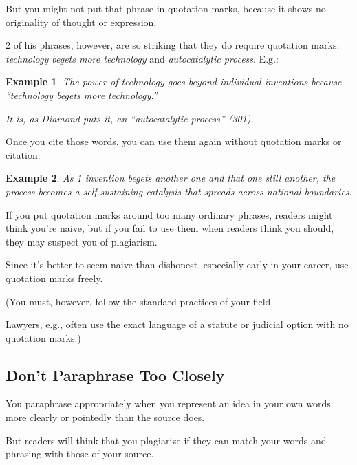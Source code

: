 \documentclass[oneside]{book}
\numberwithin{equation}{section}
\newtheorem{example}{Example}[section]
\begin{document}
But you might not put that phrase in quotation marks, because it shows no originality of thought or expression.

%
2 of his phrases, however, are so striking that they do require quotation marks: \textit{technology begets more technology} and \textit{autocatalytic process}. E.g.:
\begin{example}
    The power of technology goes beyond individual inventions because ``technology begets more technology.''
    
    It is, as Diamond puts it, an ``autocatalytic process'' (301).
\end{example}
Once you cite those words, you can use them again without quotation marks or citation:
\begin{example}
    As 1 invention begets another one and that one still another, the process becomes a self-sustaining catalysis that spreads across national boundaries.
\end{example}

If you put quotation marks around too many ordinary phrases, readers might think you're naive, but if you fail to use them when readers think you should, they may suspect you of plagiarism.

Since it's better to seem naive than dishonest, especially early in your career, use quotation marks freely.

(You must, however, follow the standard practices of your field.

Lawyers, e.g., often use the exact language of a statute or judicial option with no quotation marks.)

\subsection{Don't Paraphrase Too Closely}
You paraphrase appropriately when you represent an idea in your own words more clearly or pointedly than the source does.

But readers will think that you plagiarize if they can match your words and phrasing with those of your source.
\end{document}
